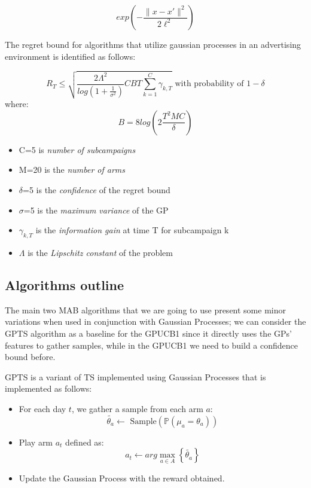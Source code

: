 \begin{displaymath}
exp \left( - \frac{ \lVert x - x' \rVert^2 }{ 2\ell^2} \right)
\end{displaymath}

The regret bound for algorithms that utilize gaussian processes in an advertising environment is identified as follows:

\begin{displaymath}
	R_T \le \sqrt{ \frac{2\Lambda^2}{log(1+\frac{1}{\sigma^2})} CBT \sum_{k=1}^C \gamma_{k, T} } \text{ with probability of } 1 - \delta
\end{displaymath}
where:
\begin{displaymath}
	B = 8log\left( 2\frac{T^2MC}{\delta} \right)
\end{displaymath}

\begin{itemize}
	\setlength\itemsep{-0.3em}
	\item C=5 is \textit{number of subcampaigns}
	\item M=20 is the \textit{number of arms}
	\item $\delta$=5 is the \textit{confidence} of the regret bound
	\item $\sigma$=5 is the \textit{maximum variance} of the GP
	\item $\gamma_{k, T}$ is the \textit{information gain} at time T for subcampaign k
	\item $\Lambda$ is the \textit{Lipschitz constant} of the problem
\end{itemize}

\subsection{Algorithms outline}

The main two MAB algorithms that we are going to use present some minor variations when used in conjunction with Gaussian Processes; we can consider the GPTS algorithm as a baseline for the GPUCB1 since it directly uses the GPs' features to gather samples, while in the GPUCB1 we need to build a confidence bound before.

GPTS is a variant of TS implemented using Gaussian Processes that is implemented as follows:

\begin{itemize}
	\item For each day $t$, we gather a sample from each arm $a$:
		\begin{displaymath}
			\tilde{\theta_a} \leftarrow \text{ Sample} \left( \mathbb{P}(\mu_a = \theta_a) \right)
		\end{displaymath}
	\item Play arm $a_t$ defined as:
		\begin{displaymath}
			a_t \leftarrow arg\max_{a \in A} \left\{ \tilde{\theta_a} \right\}
		\end{displaymath}
	\item Update the Gaussian Process with the reward obtained.
\end{itemize}

